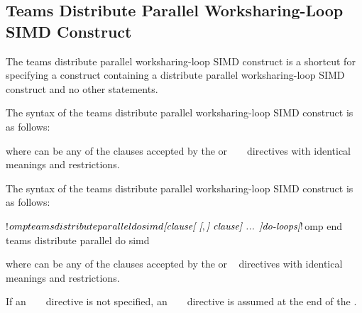 \subsection{Teams Distribute Parallel Worksharing-Loop SIMD Construct}
\label{subsec:Teams Distribute Parallel Worksharing-Loop SIMD Construct}
\summary
The teams distribute parallel worksharing-loop SIMD construct is a shortcut 
for specifying a  construct containing a distribute parallel 
worksharing-loop SIMD construct and no other statements.

\syntax
\begin{ccppspecific}
The syntax of the teams distribute parallel worksharing-loop SIMD construct 
is as follows:

\begin{ompcPragma}[fontsize=\small]
#pragma omp teams distribute parallel for simd \plc{\}
            \plc{[clause[ [},\plc{] clause] ... ] new-line}
    \plc{for-loops}
\end{ompcPragma}

where  can be any of the clauses accepted by the  or
~ ~ directives with 
identical meanings and restrictions.
\end{ccppspecific}

\begin{fortranspecific}
The syntax of the teams distribute parallel worksharing-loop SIMD construct 
is as follows:

\begin{ompfPragma}
!$omp teams distribute parallel do simd \plc{[clause[ [},\plc{] clause] ... ]}
    \plc{do-loops}
\plc{[}!$omp end teams distribute parallel do simd\plc{]}
\end{ompfPragma}

where  can be any of the clauses accepted by the  or
  ~ directives with 
identical meanings and restrictions.

If an ~   ~ 
directive is not specified, an ~  
 ~ directive is assumed at the end of
the .
\end{fortranspecific}

